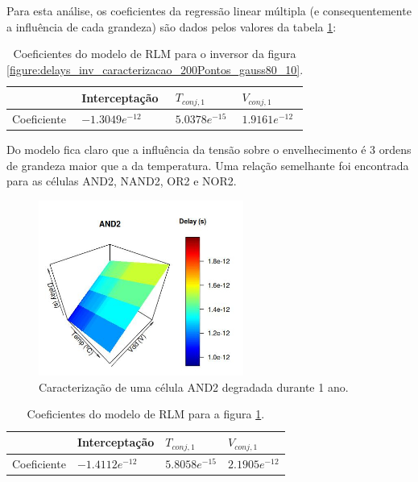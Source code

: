 Para esta análise, os coeficientes da regressão linear múltipla (e consequentemente a influência de cada grandeza) são dados pelos valores da tabela \ref{tb:regressao_multipla_INV}:
\begin{table}[H]
	\centering
	\caption{Coeficientes do modelo de RLM para o inversor da figura \ref{figure:delays_inv_caracterizacao_200Pontos_gauss80_10}.}
	\begin{tabular}{@{}l|l|l|l@{}}
		\toprule
		& Interceptação & $T_{conj,1}$ & $V_{conj,1}$ \\ \midrule
		Coeficiente & $-1.3049e^{-12}$ & $5.0378e^{-15}$ & $1.9161e^{-12}$ \\ \bottomrule
	\end{tabular}
	\label{tb:regressao_multipla_INV}
\end{table}
Do modelo fica claro que a influência da tensão sobre o envelhecimento é 3 ordens de grandeza maior que a da temperatura. Uma relação semelhante foi encontrada para as células AND2, NAND2, OR2 e NOR2.
\begin{figure}[H]
	\center
	\includegraphics[width=0.6\textwidth]{images/delays_and2_caracterizacao_200Pontos_gauss80_10}
	\caption{Caracterização de uma célula AND2 degradada durante 1 ano.}
	\label{figure:delays_and2_caracterizacao_200Pontos_gauss80_10}	
\end{figure}
\begin{table}[H]
	\centering
	\caption{Coeficientes do modelo de RLM para a figura \ref{figure:delays_and2_caracterizacao_200Pontos_gauss80_10}.}
	\begin{tabular}{@{}l|l|l|l@{}}
		\toprule
		& Interceptação & $T_{conj,1}$ & $V_{conj,1}$ \\ \midrule
		Coeficiente & $-1.4112e^{-12}$ & $5.8058e^{-15}$ & $2.1905e^{-12}$ \\ \bottomrule
	\end{tabular}	
	\label{tb:regressao_multipla_AND2}
\end{table}
